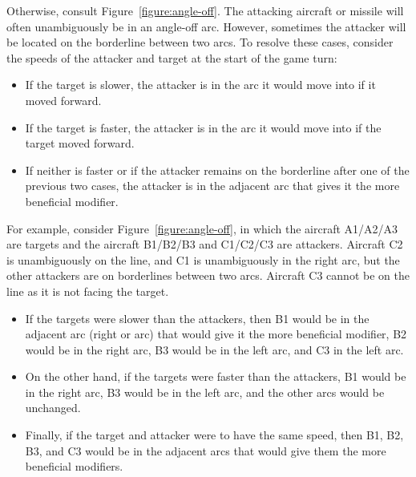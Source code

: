 {Otherwise, consult Figure~\ref{figure:angle-off}. The attacking aircraft or missile will often unambiguously be in an angle-off arc. However, sometimes the attacker will be located on the borderline between two arcs. To resolve these cases, consider the speeds of the attacker and target at the start of the game turn:
\begin{itemize}
\item If the target is slower, the attacker is in the arc it would move into if it moved forward.
\item If the target is faster, the attacker is in the arc it would move into if the target moved forward.
\item If neither is faster or if the attacker remains on the borderline after one of the previous two cases, the attacker is in the adjacent arc that gives it the more beneficial modifier.
\end{itemize}

For example, consider Figure~\ref{figure:angle-off}, in which the aircraft A1/A2/A3 are targets and the aircraft B1/B2/B3 and C1/C2/C3 are attackers. Aircraft C2 is unambiguously on the  line, and C1 is unambiguously in the right  arc, but the other attackers are on borderlines between two arcs. Aircraft C3 cannot be on the  line as it is not facing the target.

\begin{itemize}

\item
If the targets were slower than the attackers, then B1 would be in the adjacent arc (right  or  arc) that would give it the more beneficial modifier, B2 would be in the right  arc, B3 would be in the left  arc, and C3 in the left  arc. 

\item
On the other hand, if the targets were faster than the attackers, B1 would be in the right  arc, B3 would be in the left  arc, and the other arcs would be unchanged. 

\item
Finally, if the target and attacker were to have the same speed, then B1, B2, B3, and C3 would be in the adjacent arcs that would give them the more beneficial modifiers. 

\end{itemize}

}
